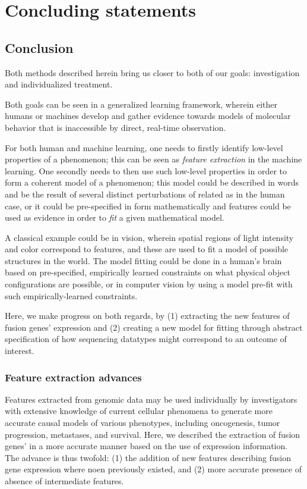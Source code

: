 \chapter{Concluding statements}


\section{Conclusion}
Both methods described herein bring us closer to both of our goals: investigation and individualized treatment.

Both goals can be seen in a generalized learning framework, wherein either humans or machines develop and gather evidence towards models of molecular behavior that is inaccessible by direct, real-time observation.

For both human and machine learning, one needs to firstly identify low-level properties of a phenomenon; this can be seen as \textit{feature extraction} in the machine learning. One secondly needs to then use such low-level properties in order to form a coherent model of a phenomenon; this model could be described in words and be the result of several distinct perturbations of related as in the human case, or it could be pre-specified in form mathematically and features could be used as evidence in order to \textit{fit} a given mathematical model.

A classical example could be in vision, wherein spatial regions of light intensity and color correspond to features, and these are used to fit a model of possible structures in the world. The model fitting could be done in a human's brain based on pre-specified, empirically learned constraints on what physical object configurations are possible, or in computer vision by using a model pre-fit with such empirically-learned constraints. 

Here, we make progress on both regards, by (1) extracting the new features of fusion genes' expression and (2) creating a new model for fitting through abstract specification of how sequencing datatypes might correspond to an outcome of interest. 

\subsection{Feature extraction advances}

Features extracted from genomic data may be used individually by investigators with extensive knowledge of current cellular phenomena to generate more accurate causal models of various phenotypes, including oncogenesis, tumor progression, metastases, and survival. Here, we described the extraction of fusion genes' in a more accurate manner based on the use of expression information. The advance is thus twofold: (1) the addition of new features describing fusion gene expression where noen previously existed, and (2) more accurate presence of absence of intermediate features.

